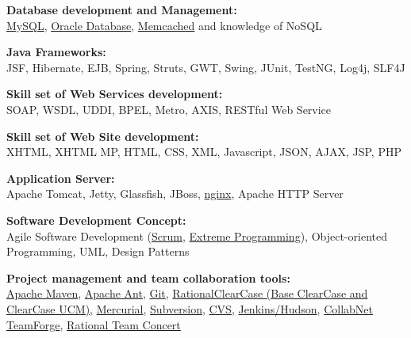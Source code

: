 \blankline

{\textbf{Database development and Management:}}\\
\href{http://www.mysql.com/}{MySQL}, 
\href{http://www.oracle.com/us/products/database/index.html}{Oracle Database}, 
\href{http://memcached.org/}{Memcached} and knowledge of NoSQL

\blankline

{\textbf{Java Frameworks:}}\\
JSF, Hibernate, EJB, Spring, Struts, GWT, Swing, JUnit, TestNG, Log4j, SLF4J

\blankline

{\textbf{Skill set of Web Services development:}}\\
SOAP, WSDL, UDDI, BPEL, Metro, AXIS, RESTful Web Service


\blankline

{\textbf{Skill set of Web Site development:}}\\
XHTML, XHTML MP, HTML, CSS, XML, Javascript, JSON, AJAX, JSP, PHP 

\blankline

{\textbf{Application Server:}}\\
Apache Tomcat, Jetty, Glassfish, JBoss, 
\href{http://nginx.net/}{nginx}, Apache HTTP Server

\blankline

{\textbf{Software Development Concept:}}\\
Agile Software Development 
(\href{http://en.wikipedia.org/wiki/Scrum_\%28development\%29}{Scrum}, 
\href{http://www.extremeprogramming.org/}{Extreme Programming}), Object-oriented Programming, UML, Design \nolinebreak Patterns

\blankline

{\textbf{Project management and team collaboration tools:}}\\
\href{http://maven.apache.org/}{Apache Maven},
\href{http://ant.apache.org/}{Apache Ant}, 
\href{http://git-scm.com/}{Git}, \href{http://www-01.ibm.com/software/awdtools/clearcase/index.html}{Rational\textregistered\space ClearCase (Base ClearCase and ClearCase UCM)},
\href{http://mercurial.selenic.com/}{Mercurial},
\href{http://subversion.tigris.org/}{Subversion}, 
\href{http://www.nongnu.org/cvs/}{CVS},
\href{http://jenkins-ci.org/}{Jenkins/Hudson},
\href{http://www.open.collab.net/products/ctf/}{CollabNet TeamForge},
\href{https://jazz.net/projects/rational-team-concert/}{Rational Team Concert}

\blankline

